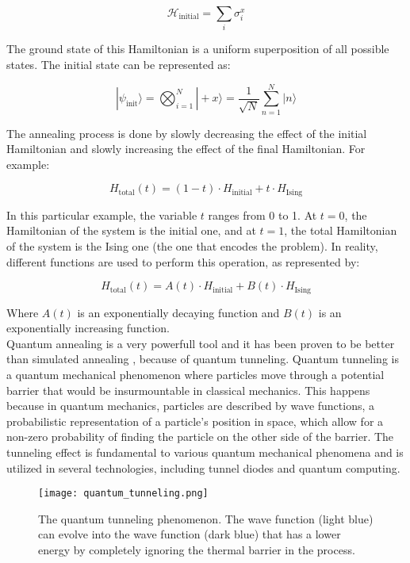 \documentclass[12pt,a4paper]{report}
\begin{document}
\[
\mathcal{H}_{\text{initial}} = \sum_i \sigma_i^x
\]


\noindent
The ground state of this Hamiltonian is a uniform superposition of all possible states. The initial state can be represented as:

\[
|\psi_{\text{init}}\rangle = \bigotimes_{i=1}^{N} |+x\rangle = \frac{1}{\sqrt{N}} \sum_{n=1}^{N} |n\rangle
\]

\noindent
The annealing process is done by slowly decreasing the effect of the initial Hamiltonian and slowly increasing the effect of the final Hamiltonian. For example:

\[
H_{\text{total}}(t) = (1-t) \cdot H_{\text{initial}} + t \cdot H_{\text{Ising}}
\]

\noindent
In this particular example, the variable \( t \) ranges from 0 to 1. At \( t=0 \), the Hamiltonian of the system is the initial one, and at \( t=1 \), the total Hamiltonian of the system is the Ising one (the one that encodes the problem). In reality, different functions are used to perform this operation, as represented by:

\[
H_{\text{total}}(t) = A(t) \cdot H_{\text{initial}} + B(t) \cdot H_{\text{Ising}}
\]

\noindent
Where \( A(t) \) is an exponentially decaying function and \( B(t) \) is an exponentially increasing function.
\\

\noindent
Quantum annealing is a very powerfull tool and it has been proven to be better than simulated annealing \cite{quantum_annealing_superior, quantum_annealing_2}, because of quantum tunneling. Quantum tunneling \cite{quantum_tunneling} is a quantum mechanical phenomenon where particles move through a potential barrier that would be insurmountable in classical mechanics. This happens because in quantum mechanics, particles are described by wave functions, a probabilistic representation of a particle's position in space, which allow for a non-zero probability of finding the particle on the other side of the barrier. The tunneling effect is fundamental to various quantum mechanical phenomena and is utilized in several technologies, including tunnel diodes \cite{tunnel_diodes} and quantum computing. 

\begin{figure}[!h]
    \centering
    \texttt{[image: quantum\_tunneling.png]}
    \caption{The quantum tunneling phenomenon. The wave function (light blue) can evolve into the wave function (dark blue) that has a lower energy by completely ignoring the thermal barrier in the process.}
    \label{fig:quantum_tunneling}
\end{figure}
\end{document}
